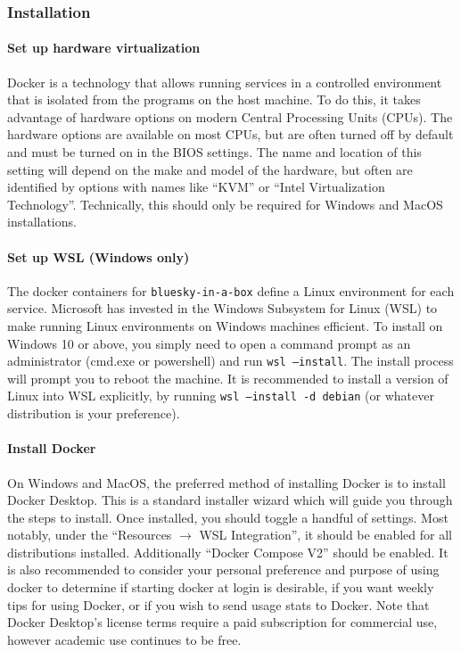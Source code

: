 \subsubsection{Installation}
\label{biab-install}

\paragraph{Set up hardware virtualization}

Docker is a technology that allows running services in a controlled environment that is isolated from the programs on the host machine.
To do this, it takes advantage of hardware options on modern Central Processing Units (CPUs).
The hardware options are available on most CPUs, but are often turned off by default and must be turned on in the BIOS settings.
The name and location of this setting will depend on the make and model of the hardware, but often are identified by options with names like ``KVM'' or ``Intel Virtualization Technology''.
Technically, this should only be required for Windows and MacOS installations.

\paragraph{Set up WSL (Windows only)}

The docker containers for \texttt{bluesky-in-a-box} define a Linux environment for each service.
Microsoft has invested in the Windows Subsystem for Linux (WSL)\cite{wsl} to make running Linux environments on Windows machines efficient.
To install on Windows 10 or above, you simply need to open a command prompt as an administrator (cmd.exe or powershell) and run \texttt{wsl --install}.
The install process will prompt you to reboot the machine.
It is recommended to install a version of Linux into WSL explicitly, by running \texttt{wsl --install -d debian} (or whatever distribution is your preference).

\paragraph{Install Docker}

On Windows and MacOS, the preferred method of installing Docker is to install Docker Desktop\cite{dockerdesktop}.
This is a standard installer wizard which will guide you through the steps to install.
Once installed, you should toggle a handful of settings.
Most notably, under the ``Resources $\rightarrow$ WSL Integration'', it should be enabled for all distributions installed.
Additionally ``Docker Compose V2'' should be enabled.
It is also recommended to consider your personal preference and purpose of using docker to determine if starting docker at login is desirable, if you want weekly tips for using Docker, or if you wish to send usage stats to Docker.
Note that Docker Desktop's license terms require a paid subscription for commercial use, however academic use continues to be free.

